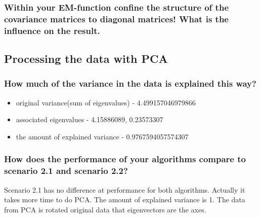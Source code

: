 \documentclass[a4paper]{article}
\begin{document}
	\subsubsection{Within your EM-function conﬁne the structure of the covariance matrices to diagonal matrices! What is the inﬂuence on the result.}
        \clearpage
	\subsection{Processing the data with PCA }
	\subsubsection{How much of the variance in the data is explained this way?}
        \begin{itemize}
          \item original variance(sum of eigenvalues) -  4.499157046979866
          \item associated eigenvalues - 4.15886089, 0.23573307
          \item the amount of explained variance - 0.9767594057574307
        \end{itemize}
        \subsubsection{How does the performance of your algorithms compare to scenario 2.1 and scenario 2.2?}

          Scenario 2.1 has no difference at performance for both algorithms. Actually it takes more time to do PCA.
          The amount of explained variance is 1. The data from PCA is rotated original data that eigenvectors are the axes.
\end{document}
